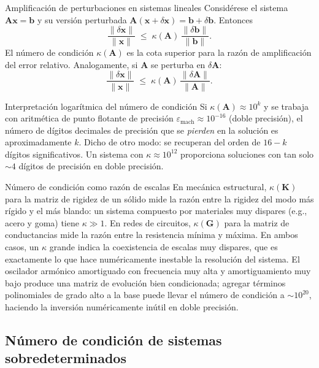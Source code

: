 \begin{teorema}{Amplificación de perturbaciones en sistemas lineales}
\label{thm:perturbacion}
Considérese el sistema $\mathbf{A}\mathbf{x} = \mathbf{b}$ y su versión
perturbada $\mathbf{A}(\mathbf{x} + \delta\mathbf{x}) = \mathbf{b} +
\delta\mathbf{b}$. Entonces
\[
  \frac{\|\delta\mathbf{x}\|}{\|\mathbf{x}\|}
  \;\leq\; \kappa(\mathbf{A})\,\frac{\|\delta\mathbf{b}\|}{\|\mathbf{b}\|}.
\]
El número de condición $\kappa(\mathbf{A})$ es la cota superior para la
razón de amplificación del error relativo. Analogamente, si $\mathbf{A}$ se
perturba en $\delta\mathbf{A}$:
\[
  \frac{\|\delta\mathbf{x}\|}{\|\mathbf{x}\|}
  \;\leq\; \kappa(\mathbf{A})\,\frac{\|\delta\mathbf{A}\|}{\|\mathbf{A}\|}.
\]
\end{teorema}

\begin{observacion}{Interpretación logarítmica del número de condición}
Si $\kappa(\mathbf{A}) \approx 10^k$ y se trabaja con aritmética de punto
flotante de precisión $\varepsilon_{\mathrm{mach}} \approx 10^{-16}$
(doble precisión), el número de dígitos decimales de precisión que se
\emph{pierden} en la solución es aproximadamente $k$. Dicho de otro modo:
se recuperan del orden de $16 - k$ dígitos significativos. Un sistema con
$\kappa \approx 10^{12}$ proporciona soluciones con tan solo $\sim 4$
dígitos de precisión en doble precisión.
\end{observacion}

\begin{fisicaconexion}{Número de condición como razón de escalas}
En mecánica estructural, $\kappa(\mathbf{K})$ para la matriz de rigidez
de un sólido mide la razón entre la rigidez del modo más rígido y el más
blando: un sistema compuesto por materiales muy dispares (e.g., acero y
goma) tiene $\kappa \gg 1$. En redes de circuitos, $\kappa(\mathbf{G})$
para la matriz de conductancias mide la razón entre la resistencia mínima
y máxima. En ambos casos, un $\kappa$ grande indica la coexistencia de
escalas muy dispares, que es exactamente lo que hace numéricamente
inestable la resolución del sistema. El oscilador armónico amortiguado con
frecuencia muy alta y amortiguamiento muy bajo produce una matriz de
evolución bien condicionada; agregar términos polinomiales de grado alto a
la base puede llevar el número de condición a $\sim 10^{20}$, haciendo la
inversión numéricamente inútil en doble precisión.
\end{fisicaconexion}

\subsection{Número de condición de sistemas sobredeterminados}
\label{ap:cond_sobred}

